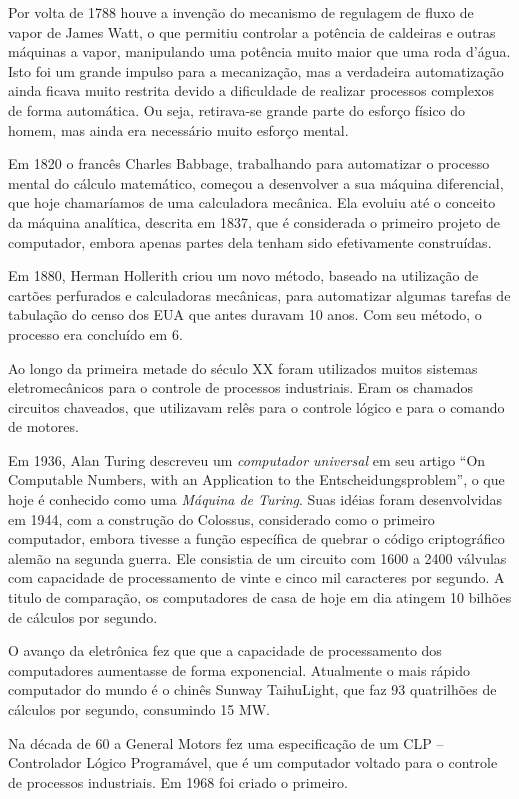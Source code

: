 Por volta de 1788 houve a invenção do mecanismo de regulagem de fluxo de vapor de James Watt, o que permitiu controlar a potência de caldeiras e outras máquinas a vapor, manipulando uma potência muito maior que uma roda d'água. Isto foi um grande impulso para a mecanização, mas a verdadeira automatização ainda ficava muito restrita devido a dificuldade de realizar processos complexos de forma automática. Ou seja, retirava-se grande parte do esforço físico do homem, mas ainda era necessário muito esforço mental.

Em 1820 o francês Charles Babbage, trabalhando para automatizar o processo mental do cálculo matemático, começou a desenvolver a sua máquina diferencial, que hoje chamaríamos de uma calculadora mecânica. Ela evoluiu até o conceito da máquina analítica, descrita em 1837, que é considerada o primeiro projeto de computador, embora apenas partes dela tenham sido efetivamente construídas.

 Em 1880, Herman Hollerith criou um novo método, baseado na utilização de cartões perfurados e calculadoras mecânicas, para automatizar algumas tarefas de tabulação do censo dos EUA que antes duravam 10 anos. Com seu método, o processo era concluído em 6.

Ao longo da primeira metade do século XX foram utilizados muitos sistemas eletromecânicos para o controle de processos industriais. Eram os chamados circuitos chaveados, que utilizavam relês para o controle lógico e para o comando de motores.

Em 1936, Alan Turing descreveu um \emph{computador universal} em seu artigo “On Computable Numbers, with an Application to the Entscheidungsproblem”, o que hoje é conhecido como uma \emph{Máquina de Turing}. Suas idéias foram desenvolvidas em 1944, com a construção do Colossus, considerado como o primeiro computador, embora tivesse a função específica de quebrar o código criptográfico alemão na segunda guerra. Ele consistia de um circuito com 1600 a 2400 válvulas com capacidade de processamento de vinte e cinco mil caracteres por segundo. A titulo de comparação, os computadores de casa de hoje em dia atingem 10 bilhões de cálculos por segundo.

O avanço da eletrônica fez que que a capacidade de processamento dos computadores aumentasse de forma exponencial. Atualmente o mais rápido computador do mundo é o chinês Sunway TaihuLight, que faz 93 quatrilhões de cálculos por segundo, consumindo 15 MW.

Na década de 60 a General Motors fez uma especificação de um CLP -- Controlador Lógico Programável, que é um computador voltado para o controle de processos industriais. Em 1968 foi criado o primeiro.


